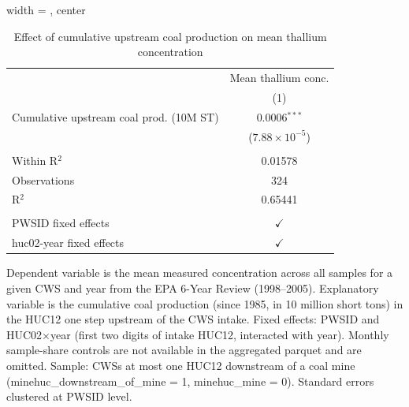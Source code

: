 
\begin{table}[htbp]
   
   \caption{\label{tab:6yr_huc02fe_thallium_mean} Effect of cumulative upstream coal production on mean thallium concentration}
   \bigskip
   
   \centering
   
   \begin{adjustbox}{width = \textwidth, center}
      
      
      \begin{tabular}{lc}
         \toprule
         
                                                 & Mean thallium conc.\\  
         
                                                 & (1)\\  
         
         \midrule 
         Cumulative upstream coal prod. (10M ST) & 0.0006$^{***}$\\   
                                                 & ($7.88\times 10^{-5}$)\\    
         
          \\
         
         Within R$^2$                            & 0.01578\\  
         Observations                            & 324\\  
         R$^2$                                   & 0.65441\\  
         
          \\
         
         PWSID fixed effects                     & $\checkmark$\\   
         huc02-year fixed effects                & $\checkmark$\\   
         
         \bottomrule
         
      \end{tabular}
      
      
      
   \end{adjustbox}
      {\tiny\linespread{1}\selectfont \par \raggedright 
   Dependent variable is the mean measured concentration across all samples for a given CWS and year from the EPA 6-Year Review (1998--2005). Explanatory variable is the cumulative coal production (since 1985, in 10 million short tons) in the HUC12 one step upstream of the CWS intake. Fixed effects: PWSID and HUC02$\times$year (first two digits of intake HUC12, interacted with year). Monthly sample-share controls are not available in the aggregated parquet and are omitted. Sample: CWSs at most one HUC12 downstream of a coal mine (minehuc\_downstream\_of\_mine = 1, minehuc\_mine = 0). Standard errors clustered at PWSID level.}
   
\end{table}


